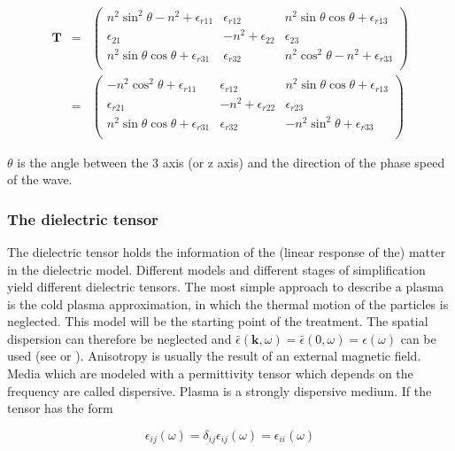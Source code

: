 \documentclass[a4paper,11pt]{article}
\begin{document}
\begin{eqnarray}\label{eq:radiation_tensor}
    \mathbf{T}
&=&
\left(%
\begin{array}{ccc}
   n^2 \sin^2 \theta -n^2 +\epsilon_{r11} &  \epsilon_{r12} & n^2 \sin \theta \cos \theta +\epsilon_{r13}\\
\epsilon_{21}&  -n^2+\epsilon_{22} & \epsilon_{23}\\
 n^2 \sin \theta \cos \theta +\epsilon_{r31} & \epsilon_{r32} &  n^2 \cos^2 \theta -n^2+\epsilon_{r33} \\
\end{array}%
\right)\nonumber\\
&=&
\left(%
\begin{array}{ccc}
   -n^2 \cos^2 \theta +\epsilon_{r11} &  \epsilon_{r12} & n^2 \sin \theta \cos \theta +\epsilon_{r13}\\
\epsilon_{r21}&  -n^2+\epsilon_{r22} & \epsilon_{r23}\\
 n^2 \sin \theta \cos \theta +\epsilon_{r31} & \epsilon_{r32} &  - n^2 \sin^2 \theta +\epsilon_{r33} \\
\end{array}%
\right)
\end{eqnarray}

$\theta$ is the angle between the 3 axis (or z axis) and the direction of the phase speed of the wave.


\subsubsection{The dielectric tensor}
The dielectric tensor holds the information of the (linear response of the) matter in the dielectric model. Different models and different stages of simplification yield different dielectric tensors. The most simple approach to describe a plasma is the cold plasma approximation, in which the thermal motion of the particles is neglected. This model will be the starting point of the treatment. The spatial dispersion can therefore be neglected and $\bar{\epsilon}(\mathbf{k},\omega)=\bar{\epsilon}(0,\omega)=\epsilon(\omega)$ can be used (see \cite{ginzburg} or \cite{stix}). Anisotropy is usually the result of an external magnetic field.\\

Media which are modeled with a permittivity tensor which depends on the frequency are called dispersive. Plasma is a strongly dispersive medium. If the tensor has the form

\begin{equation}
    \epsilon_{ij}(\omega)=\delta_{ij} \epsilon_{ij}(\omega)=\epsilon_{ii}(\omega)
\end{equation}
\end{document}
